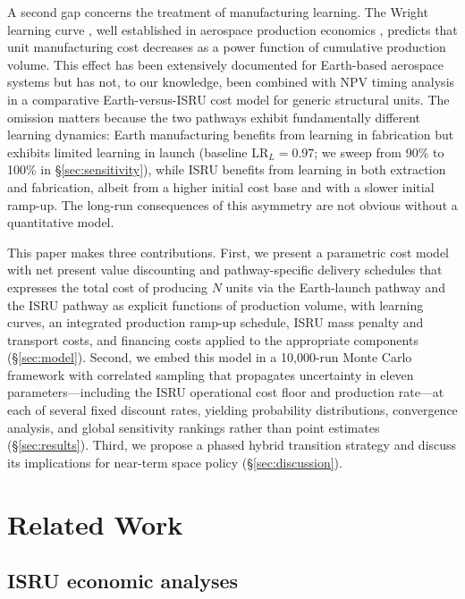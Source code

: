 \documentclass[preprint,12pt]{elsarticle}
\begin{document}
A second gap concerns the treatment of manufacturing learning. The Wright learning curve \cite{wright1936}, well established in aerospace production economics \cite{wertz2011}, predicts that unit manufacturing cost decreases as a power function of cumulative production volume. This effect has been extensively documented for Earth-based aerospace systems \cite{argote1990,nagy2013} but has not, to our knowledge, been combined with NPV timing analysis in a comparative Earth-versus-ISRU cost model for generic structural units. The omission matters because the two pathways exhibit fundamentally different learning dynamics: Earth manufacturing benefits from learning in fabrication but exhibits limited learning in launch (baseline $\mathrm{LR}_L = 0.97$; we sweep from 90\% to 100\% in \S\ref{sec:sensitivity}), while ISRU benefits from learning in both extraction and fabrication, albeit from a higher initial cost base and with a slower initial ramp-up. The long-run consequences of this asymmetry are not obvious without a quantitative model.

This paper makes three contributions. First, we present a parametric cost model with net present value discounting and pathway-specific delivery schedules that expresses the total cost of producing $N$ units via the Earth-launch pathway and the ISRU pathway as explicit functions of production volume, with learning curves, an integrated production ramp-up schedule, ISRU mass penalty and transport costs, and financing costs applied to the appropriate components (\S\ref{sec:model}). Second, we embed this model in a 10{,}000-run Monte Carlo framework with correlated sampling that propagates uncertainty in eleven parameters---including the ISRU operational cost floor and production rate---at each of several fixed discount rates, yielding probability distributions, convergence analysis, and global sensitivity rankings rather than point estimates (\S\ref{sec:results}). Third, we propose a phased hybrid transition strategy and discuss its implications for near-term space policy (\S\ref{sec:discussion}).

\section{Related Work}
\label{sec:related}

\subsection{ISRU economic analyses}
\end{document}
